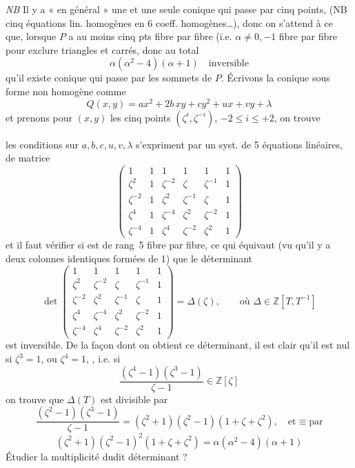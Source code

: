 \documentclass[11pt,a4paper]{article}
\begin{document}
\emph{NB} Il y a « en général » une et une seule conique qui passe par cinq points, (NB cinq équations lin. homogènes en 6 coeff. homogènes…), donc on s'attend à ce que, lorsque $P$ a au moins cinq pts fibre par fibre (i.e. $\alpha \neq 0, -1$ fibre par fibre pour exclure triangles et carrés, donc au total
\[
  \alpha(\alpha^2 - 4)(\alpha + 1) \quad \text{inversible}
\]
qu'il existe  \struck{\ill{}} conique qui passe par les sommets de $P$. Écrivons la conique sous forme non homogène comme
\[
  Q(x,y) = a x^2 + 2b\, xy + c y^2 + u x + v y + \lambda
\]
et prenons pour $(x,y)$ les cinq points $(\zeta^{i}, \zeta^{-i})$, $-2 \leq i \leq +2$, on trouve

les conditions sur $a, b, c, u, v, \lambda$ s'expriment par un syst. de 5 équations linéaires, de matrice
\[
  \begin{pmatrix}
    1 & 1 & 1 & 1 & 1 & 1 \\
    \zeta^{2} & 1 & \zeta^{-2} & \zeta & \zeta^{-1} & 1 \\
    \zeta^{-2} & 1 & \zeta^{2} & \zeta^{-1} & \zeta & 1 \\
    \zeta^{4} & 1 & \zeta^{-4} & \zeta^{2} & \zeta^{-2} & 1 \\
    \zeta^{-4} & 1 & \zeta^{4} & \zeta^{-2} & \zeta^{2} & 1
  \end{pmatrix}
\]
et il faut vérifier si \struck{\ill{}}  est de rang~5 fibre par fibre, ce qui équivaut (vu qu'il y a deux colonnes identiques formées de 1) que le déterminant \struck{\ill{}}
\[
  \det
  \begin{pmatrix}
    1 & 1 & 1 & 1 & 1 \\
    \zeta^{2} & \zeta^{-2} & \zeta & \zeta^{-1} & 1 \\
    \zeta^{-2} & \zeta^{2} & \zeta^{-1} & \zeta & 1 \\
    \zeta^{4} & \zeta^{-4} & \zeta^{2} & \zeta^{-2} & 1 \\
    \zeta^{-4} & \zeta^{4} & \zeta^{-2} & \zeta^{2} & 1
  \end{pmatrix}
  = \Delta(\zeta), \qquad \text{où } \Delta \in \mathbb{Z}[T, T^{-1}]
\]
est inversible. De la façon dont on obtient ce déterminant, il  est clair qu'il est nul si \struck{\ill{}} $\zeta^{3} = 1$, ou $\zeta^{4} = 1$, , i.e. si
\[
  \frac{(\zeta^{4} - 1)(\zeta^{3} - 1)}{\zeta - 1} \in \mathbb{Z}[\zeta]
\]
on trouve que $\Delta(T)$ est divisible par
\[
  \frac{(\zeta^{2}-1)(\zeta^{3}-1)}{\zeta - 1} = (\zeta^{2}+1)(\zeta^{2}-1)(1 + \zeta + \zeta^{2}), \quad \text{et} \equiv \text{par}
\]
\[
  (\zeta^{2}+1)(\zeta^{2}-1)^{2}(1 + \zeta + \zeta^{2}) = \alpha(\alpha^{2} - 4)(\alpha + 1)
\]
Étudier la multiplicité dudit déterminant ?
\end{document}
